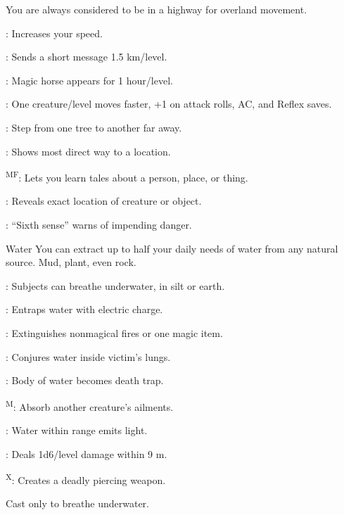 {}
{You are always considered to be in a highway for overland movement.}
{
	\item {}: Increases your speed.
	\item {}: Sends a short message 1.5 km/level.
	\item {}: Magic horse appears for 1 hour/level.
	\item {}: One creature/level moves faster, +1 on attack rolls, AC, and Reflex saves.
	\item {}: Step from one tree to another far away.
	\item {}: Shows most direct way to a location.
	\item {}\textsuperscript{MF}: Lets you learn tales about a person, place, or thing.
	\item {}: Reveals exact location of creature or object.
	\item {}: ``Sixth sense'' warns of impending danger.
}

{Water}
{You can extract up to half your daily needs of water from any natural source. Mud, plant, even rock.}
{
	\item {}\footnotemark[1]: Subjects can breathe underwater, in silt or earth.
	\item {}: Entraps water with electric charge.
	\item {}: Extinguishes nonmagical fires or one magic item.
	\item {}: Conjures water inside victim's lungs.
	\item {}: Body of water becomes death trap.
	\item {}\textsuperscript{M}: Absorb another creature's ailments.
	\item {}: Water within range emits light.
	\item {}: Deals 1d6/level damage within 9 m.
	\item {}\textsuperscript{X}: Creates a deadly piercing weapon.
}
 Cast only to breathe underwater.

